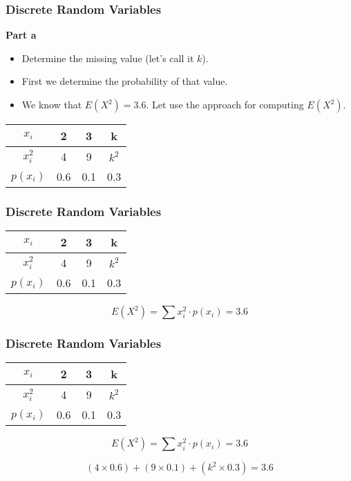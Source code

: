 \documentclass{beamer}
\begin{document}
\begin{frame}
\frametitle{Discrete Random Variables}
\Large
\textbf{Part a}
\begin{itemize}
\item Determine the missing value (let's call it $k$).\\
\item First we determine the probability of that value. 
\item We know that $E(X^2)=3.6$. Let use the approach for computing $E(X^2)$.

\end{itemize}

\begin{center}
\begin{tabular}{|c|c|c|c|}
\hline
$x_i$ & \phantom{sp}2\phantom{sp} & \phantom{sp}3\phantom{sp} & \phantom{sp}k\phantom{sp} \\ \hline
$x^2_i$ & 4 & 9 & $k^2$ \\ \hline
$p(x_i)$ & 0.6 &  0.1 & \alert{0.3} \\ \hline 
\end{tabular}
\end{center}
\end{frame}

\begin{frame}
\frametitle{Discrete Random Variables}
\Large
\vspace{-2cm}

\begin{center}
\begin{tabular}{|c|c|c|c|}
\hline
$x_i$ & \phantom{sp}2\phantom{sp} & \phantom{sp}3\phantom{sp} & \phantom{sp}k\phantom{sp} \\ \hline
$x^2_i$ & 4 & 9 & $k^2$ \\ \hline
$p(x_i)$ & 0.6 &  0.1 & 0.3 \\ \hline 
\end{tabular}
\end{center}



\[ E(X^2) =  \sum  x^2_i \cdot p(x_i)  = 3.6 \]


\end{frame}

\begin{frame}
\frametitle{Discrete Random Variables}
\Large
\vspace{-2cm}

\begin{center}
\begin{tabular}{|c|c|c|c|}
\hline
$x_i$ & \phantom{sp}2\phantom{sp} & \phantom{sp}3\phantom{sp} & \phantom{sp}k\phantom{sp} \\ \hline
$x^2_i$ & 4 & 9 & $k^2$ \\ \hline
$p(x_i)$ & 0.6 &  0.1 & 0.3 \\ \hline 
\end{tabular}
\end{center}



\[ E(X^2) =  \sum  x^2_i \cdot p(x_i)  = 3.6 \]

\[(4 \times 0.6) + (9\times 0.1) + (k^2\times 0.3) = 3.6 \]
\end{frame}
\end{document}
